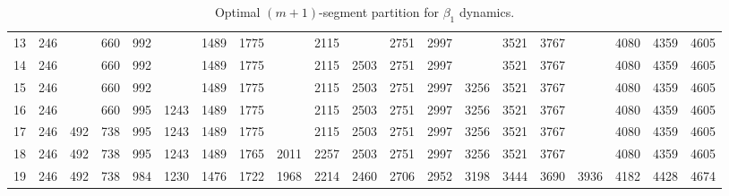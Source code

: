 \begin{landscape}
\begin{table}
\begin{tabular}{|c|ccccccccccccccccccc|}
                13 &  246 &     & 660 & 992 &      & 1489 & 1775 &      & 2115 &      & 2751 & 2997 &      & 3521 & 3767 &      & 4080 & 4359 & 4605\\
                14 &  246 &     & 660 & 992 &      & 1489 & 1775 &      & 2115 & 2503 & 2751 & 2997 &      & 3521 & 3767 &      & 4080 & 4359 & 4605\\
                15 &  246 &     & 660 & 992 &      & 1489 & 1775 &      & 2115 & 2503 & 2751 & 2997 & 3256 & 3521 & 3767 &      & 4080 & 4359 & 4605\\
                16 &  246 &     & 660 & 995 & 1243 & 1489 & 1775 &      & 2115 & 2503 & 2751 & 2997 & 3256 & 3521 & 3767 &      & 4080 & 4359 & 4605\\
                17 &  246 & 492 & 738 & 995 & 1243 & 1489 & 1775 &      & 2115 & 2503 & 2751 & 2997 & 3256 & 3521 & 3767 &      & 4080 & 4359 & 4605\\
                18 &  246 & 492 & 738 & 995 & 1243 & 1489 & 1765 & 2011 & 2257 & 2503 & 2751 & 2997 & 3256 & 3521 & 3767 &      & 4080 & 4359 & 4605\\
                19 &  246 & 492 & 738 & 984 & 1230 & 1476 & 1722 & 1968 & 2214 & 2460 & 2706 & 2952 & 3198 & 3444 & 3690 & 3936 & 4182 & 4428 & 4674\\
                \hline
            \end{tabular}
            \caption{Optimal $(m+1)$-segment partition for $\beta_1$ dynamics.}
            \label{tab:optimal_partition_beta1}
        \end{table}


\end{landscape}
